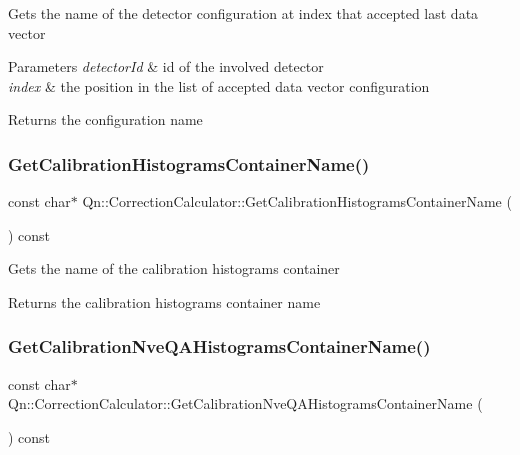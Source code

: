 Gets the name of the detector configuration at index that accepted last data vector 
\begin{DoxyParams}{Parameters}
{\em detector\+Id} & id of the involved detector \\
\hline
{\em index} & the position in the list of accepted data vector configuration \\
\hline
\end{DoxyParams}
\begin{DoxyReturn}{Returns}
the configuration name 
\end{DoxyReturn}
\mbox{\label{classQn_1_1CorrectionCalculator_a7aeab06a810f9b535b9c7532b64c57e7}} 
\subsubsection{\texorpdfstring{Get\+Calibration\+Histograms\+Container\+Name()}{GetCalibrationHistogramsContainerName()}}
{\footnotesize\ttfamily const char$\ast$ Qn\+::\+Correction\+Calculator\+::\+Get\+Calibration\+Histograms\+Container\+Name (\begin{DoxyParamCaption}{ }\end{DoxyParamCaption}) const\hspace{0.3cm}{\ttfamily [inline]}}

Gets the name of the calibration histograms container \begin{DoxyReturn}{Returns}
the calibration histograms container name 
\end{DoxyReturn}
\mbox{\label{classQn_1_1CorrectionCalculator_a2cb630436105a18170a5adc2d1dae78a}} 
\subsubsection{\texorpdfstring{Get\+Calibration\+Nve\+Q\+A\+Histograms\+Container\+Name()}{GetCalibrationNveQAHistogramsContainerName()}}
{\footnotesize\ttfamily const char$\ast$ Qn\+::\+Correction\+Calculator\+::\+Get\+Calibration\+Nve\+Q\+A\+Histograms\+Container\+Name (\begin{DoxyParamCaption}{ }\end{DoxyParamCaption}) const\hspace{0.3cm}{\ttfamily [inline]}}

